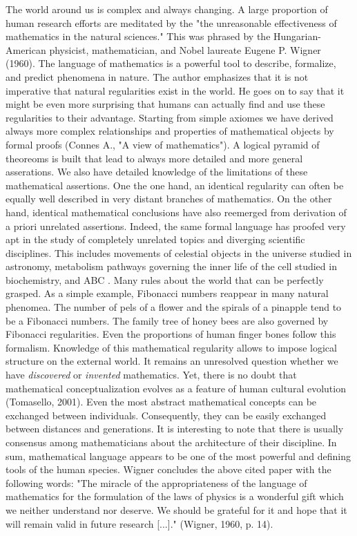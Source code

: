 \documentclass[authoryear,review,3p]{elsarticle}
\begin{document}
The world around us is complex and always changing.
%
A large proportion of human research efforts are meditated by the 
"the unreasonable effectiveness of mathematics in the natural sciences."
This was phrased by the Hungarian-American
physicist, mathematician, and Nobel laureate Eugene P. Wigner (1960).
The language of mathematics is a powerful tool to
describe, formalize, and predict phenomena in nature.
The author emphasizes that it is not imperative that
natural regularities exist in the world. He goes on to
say that it might be even more surprising that humans can actually
find and use these regularities to their advantage.
%
Starting from simple axiomes we have derived always more complex
relationships and properties of mathematical objects by formal proofs
(Connes A., "A view of mathematics").
A logical pyramid of theoreoms is built that lead to always
more detailed and more general asserations.
We also have detailed knowledge of the limitations of these mathematical
assertions.
%
One the one hand,
an identical regularity can often be equally well described in very distant
branches of mathematics.
On the other hand,
identical mathematical conclusions have also reemerged from derivation of
a priori unrelated assertions.
%
Indeed, the same formal language has proofed very apt in
the study of completely unrelated topics and diverging scientific disciplines.
This includes movements of celestial objects in the universe studied in astronomy,
metabolism pathways governing the inner life of the cell studied in biochemistry,
and
ABC
.
%
Many rules about the world that can be perfectly grasped.
As a simple example,
Fibonacci numbers reappear in many natural phenomea.
The number of pels of a flower and the spirals of a pinapple tend
to be a Fibonacci numbers.
The family tree of honey bees are also governed by Fibonacci regularities.
Even the proportions of human finger bones follow this formalism.
Knowledge of this mathematical regularity
allows to impose logical structure on the external world.
%
It remains an unresolved question whether we have
\textit{discovered} or \textit{invented} mathematics.
Yet, there is no doubt
that mathematical conceptualization
evolves as a feature of human cultural evolution (Tomasello, 2001).
Even the most abstract mathematical concepts can
be exchanged between individuals. Consequently,
they can be easily exchanged between distances and generations.
It is interesting to note that there is usually consensus among mathematicians
about the architecture of their discipline.
In sum, mathematical language
appears to be one of the most
powerful and defining tools of the human species.
Wigner concludes the above cited paper with the following words:
"The miracle of the appropriateness of the language of mathematics
for the formulation of the laws of physics is a wonderful gift
which we neither understand nor deserve. We should be grateful for
it and hope that it will remain valid in future research [...]."
(Wigner, 1960, p. 14).
\end{document}
